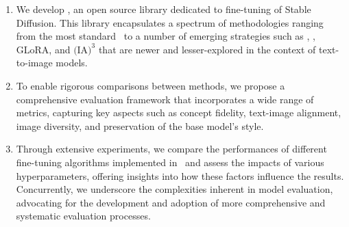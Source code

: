 \begin{enumerate}
    \item We develop \lycoris, an open source library dedicated to %
    fine-tuning of Stable Diffusion. This library encapsulates a spectrum of methodologies ranging from the most standard \lora~to a number of emerging strategies such as \loha, \lokr, GLoRA, and $\text{(IA)}^3$ that are newer and lesser-explored in the context of text-to-image models.

    
    \item To enable rigorous comparisons between methods, we propose a comprehensive evaluation framework that incorporates a wide range of metrics, capturing key aspects such as concept fidelity, text-image alignment, image diversity, and preservation of the base model's style.
    \item 
    Through extensive experiments, we compare the performances of different fine-tuning algorithms implemented in \lycoris~and assess the impacts of various hyperparameters, offering insights into how these factors influence the results.
    Concurrently, we underscore the complexities inherent in model evaluation, advocating for the development and adoption of more comprehensive and systematic evaluation processes.
\end{enumerate}

